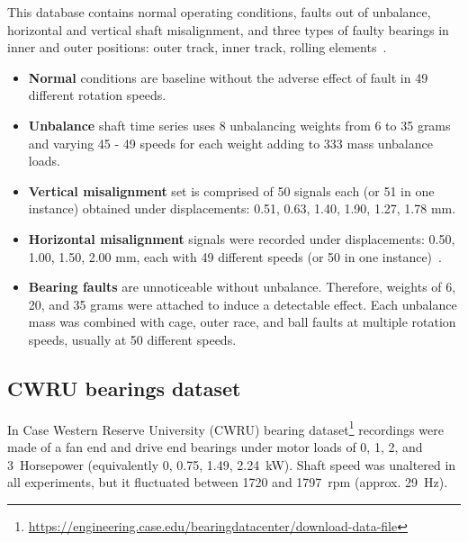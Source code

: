 This database contains normal operating conditions, faults out of unbalance, horizontal and vertical shaft misalignment, and three types of faulty bearings in inner and outer positions: outer track, inner track, rolling elements~\cite{pestana-viana_influence_2016}.
\begin{itemize}
\itemsep0pt
\item \textbf{Normal} conditions are baseline without the adverse effect of fault in 49 different rotation speeds. 
\item \textbf{Unbalance} shaft time series uses 8 unbalancing weights from 6 to 35 grams and varying 45 - 49 speeds for each weight adding to 333 mass unbalance loads. 
\item \textbf{Vertical misalignment} set is comprised of 50 signals each (or 51 in one instance) obtained under displacements: 0.51, 0.63, 1.40, 1.90, 1.27, 1.78 mm.
\item \textbf{Horizontal misalignment} signals were recorded under displacements: 0.50, 1.00, 1.50, 2.00 mm, each with 49 different speeds (or 50 in one instance)~\cite{pestana-viana_influence_2016}.
\item \textbf{Bearing faults} are unnoticeable without unbalance. Therefore, weights of 6, 20, and 35 grams were attached to induce a detectable effect. Each unbalance mass was combined with cage, outer race, and ball faults at multiple rotation speeds, usually at 50 different speeds.
\end{itemize}


\subsection{CWRU bearings dataset}
In Case Western Reserve University (CWRU) bearing dataset\footnote{\url{https://engineering.case.edu/bearingdatacenter/download-data-file}} recordings were made of a fan end and drive end bearings under motor loads of 0, 1, 2, and 3~Horsepower (equivalently 0, 0.75, 1.49, 2.24~kW). Shaft speed was unaltered in all experiments, but it fluctuated between 1720 and 1797~rpm (approx. 29~Hz).

